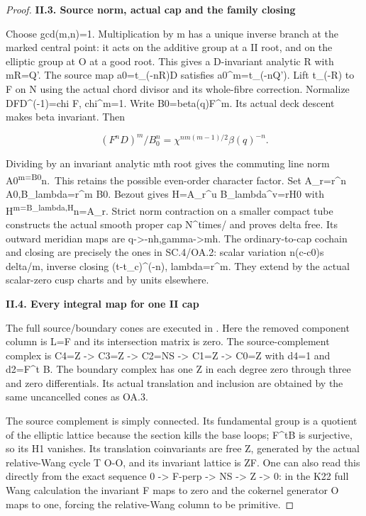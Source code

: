 \begin{proof}
\par

\medskip\noindent\textbf{II.3. Source norm, actual cap and the family closing}

Choose gcd(m,n)=1. Multiplication by m has a unique inverse
branch at the marked central point: it acts on the additive
group at a II root, and on the elliptic group at O at a good
root. This gives a D-invariant analytic R with mR=Q'.
The source map a0=t\_(-nR)D satisfies a0\^{}m=t\_(-nQ').
Lift t\_(-R) to F on N using the actual chord divisor and its
whole-fibre correction. Normalize DFD\^{}(-1)=chi F, chi\^{}m=1.
Write B0=beta(q)F\^{}m. Its actual deck descent makes beta
invariant. Then

\[
(F^nD)^m/B_0^n=\chi^{nm(m-1)/2}\beta(q)^{-n}.
\]

Dividing by an invariant analytic mth root gives the commuting
line norm A0\textsuperscript{m=B0}n.~This retains the possible even-order
character factor. Set A\_r=r\^{}n A0,B\_lambda=r\^{}m B0. Bezout
gives H=A\_r\^{}u B\_lambda\^{}v=rH0 with H\textsuperscript{m=B\_lambda,H}n=A\_r.
Strict norm contraction on a smaller compact tube constructs
the actual smooth proper cap N\^{}times/ and proves delta
free. Its outward meridian maps are q-\textgreater-nh,gamma-\textgreater mh.
The ordinary-to-cap cochain and closing are precisely the
ones in SC.4/OA.2: scalar variation n(c-c0)s delta/m,
inverse closing (t-t\_c)\^{}(-n), lambda=r\^{}m. They extend by
the actual scalar-zero cusp charts and by units elsewhere.

\par

\medskip\noindent\textbf{II.4. Every integral map for one II cap}

The full source/boundary cones are executed in
. Here the removed
component column is L=F and its intersection matrix is zero.
The source-complement complex is C4=Z -\textgreater{} C3=Z -\textgreater{} C2=NS
-\textgreater{} C1=Z -\textgreater{} C0=Z with d4=1 and d2=F\^{}t B. The boundary
complex has one Z in each degree zero through three and
zero differentials. Its actual translation and inclusion
are obtained by the same uncancelled cones as OA.3.

The source complement is simply connected. Its fundamental
group is a quotient of the elliptic lattice because the section
kills the base loops; F\^{}tB is surjective, so its H1 vanishes.
Its translation coinvariants are free Z, generated by the
actual relative-Wang cycle T O-O, and its invariant lattice
is ZF. One can also read this directly from the exact sequence
0 -\textgreater{} F-perp -\textgreater{} NS -\textgreater{} Z -\textgreater{} 0: in the K22 full Wang calculation
the invariant F maps to zero and the cokernel generator O
maps to one, forcing the relative-Wang column to be primitive.


\end{proof}
